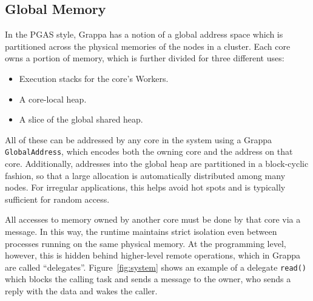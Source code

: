 \subsection{Global Memory}
In the PGAS style, Grappa has a notion of a global address space which is partitioned across the physical memories of the nodes in a cluster. Each core owns a portion of memory, which is further divided for three different uses:
\begin{itemize}
  \item Execution stacks for the core's Workers.
  \item A core-local heap.
  \item A slice of the global shared heap.
\end{itemize}
All of these can be addressed by any core in the system using a Grappa \texttt{GlobalAddress}, which encodes both the owning core and the address on that core. Additionally, addresses into the global heap are partitioned in a block-cyclic fashion, so that a large allocation is automatically distributed among many nodes. For irregular applications, this helps avoid hot spots and is typically sufficient for random access.

All accesses to memory owned by another core must be done by that core via a message. In this way, the runtime maintains strict isolation even between processes running on the same physical memory. At the programming level, however, this is hidden behind higher-level remote operations, which in Grappa are called ``delegates''. Figure~\ref{fig:system} shows an example of a delegate \texttt{read()} which blocks the calling task and sends a message to the owner, who sends a reply with the data and wakes the caller.

